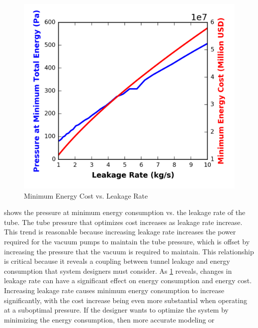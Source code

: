 \begin{figure}
	\centering
	\includegraphics{../../images/graphs/leakage_trades/leakage_rate.png}
	\caption{Minimum Energy Cost vs. Leakage Rate}
	\label{fig:pres_vs_leakage_rate}
\end{figure}
 shows the pressure at minimum energy
consumption vs. the leakage rate of the tube. The tube pressure that optimizes
cost increases as leakage rate increase. This trend is reasonable because
increasing leakage rate increases the power required for the vacuum pumps to
maintain the tube pressure, which is offset by increasing the pressure that the
vacuum is required to maintain. This relationship is critical because it
reveals a coupling between tunnel leakage and energy consumption that system
designers must consider. As \cref{fig:pres_vs_leakage_rate} reveals, changes
in leakage rate can have a significant effect on energy consumption and energy cost.
Increasing leakage rate causes minimum energy consumption to increase
significantly, with the cost increase being even more substantial when
operating at a suboptimal pressure. If the designer wants to optimize the
system by minimizing the energy consumption, then more accurate modeling or
